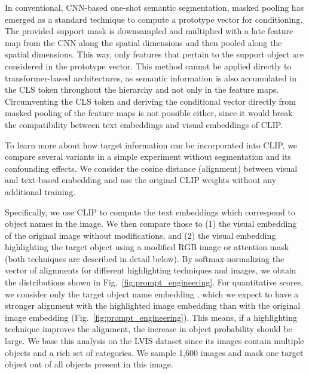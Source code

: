 \documentclass[10pt,twocolumn,letterpaper]{article}
\begin{document}
In conventional, CNN-based one-shot semantic segmentation, masked pooling \cite{shaban17} has emerged as a standard technique to compute a prototype vector for conditioning. The provided support mask is downsampled and multiplied with a late feature map from the CNN along the spatial dimensions and then pooled along the spatial dimensions. This way, only features that pertain to the support object are considered in the prototype vector.
This method cannot be applied directly to transformer-based architectures, as semantic information is also accumulated in the CLS token throughout the hierarchy and not only in the feature maps. 
Circumventing the CLS token and deriving the conditional vector directly from masked pooling of the feature maps is not possible either, since it would break the compatibility between text embeddings and visual embeddings of CLIP.

To learn more about how target information can be incorporated into CLIP, we compare several variants in a simple experiment without segmentation and its confounding effects.
We consider the cosine distance (alignment) between visual and text-based embedding and use the original CLIP weights without any additional training.




Specifically, we use CLIP to compute the text embeddings  which correspond to object names in the image. We then compare those to (1) the visual embedding of the original image without modifications,  and (2) the visual embedding  highlighting the target object using a modified RGB image or attention mask (both techniques are described in detail below).
By softmax-normalizing the vector of alignments  for different highlighting techniques and images, we obtain the distributions shown in Fig.~\ref{fig:prompt_engineering}.
For quantitative scores, we consider only the target object name embedding , which we expect to have a stronger alignment with the highlighted image embedding  than with the original image embedding  (Fig.~\ref{fig:prompt_engineering}). This means, if a highlighting technique improves the alignment, the increase in object probability  should be large.
We base this analysis on the LVIS dataset \cite{gupta19lvis} since its images contain multiple objects and a rich set of categories. We sample 1,600 images and mask one target object out of all objects present in this image. 
\end{document}
